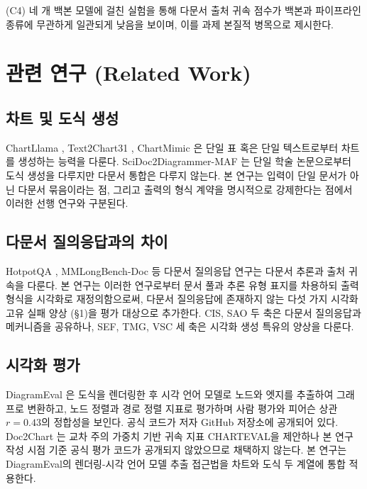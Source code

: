 \documentclass[11pt]{article}
\begin{document}
(C4) 네 개 백본 모델에 걸친 실험을 통해 다문서 출처 귀속 점수가 백본과 파이프라인 종류에 무관하게 일관되게 낮음을 보이며, 이를 과제 본질적 병목으로 제시한다.

\section{관련 연구 (Related Work)}

\subsection{차트 및 도식 생성}

ChartLlama \cite{han2023chartllama}, Text2Chart31 \cite{zadeh2024text2chart31}, ChartMimic \cite{yang2024chartmimic}은 단일 표 혹은 단일 텍스트로부터 차트를 생성하는 능력을 다룬다. SciDoc2Diagrammer-MAF \cite{mondal2024scidoc2diagrammer}는 단일 학술 논문으로부터 도식 생성을 다루지만 다문서 통합은 다루지 않는다. 본 연구는 입력이 단일 문서가 아닌 다문서 묶음이라는 점, 그리고 출력의 형식 계약을 명시적으로 강제한다는 점에서 이러한 선행 연구와 구분된다.

\subsection{다문서 질의응답과의 차이}

HotpotQA \cite{yang2018hotpotqa}, MMLongBench-Doc \cite{ma2024mmlongbench} 등 다문서 질의응답 연구는 다문서 추론과 출처 귀속을 다룬다. 본 연구는 이러한 연구로부터 문서 풀과 추론 유형 표지를 차용하되 출력 형식을 시각화로 재정의함으로써, 다문서 질의응답에 존재하지 않는 다섯 가지 시각화 고유 실패 양상 (\S 1)을 평가 대상으로 추가한다. CIS, SAO 두 축은 다문서 질의응답과 메커니즘을 공유하나, SEF, TMG, VSC 세 축은 시각화 생성 특유의 양상을 다룬다.

\subsection{시각화 평가}

DiagramEval \cite{liang2025diagrameval}은 도식을 렌더링한 후 시각 언어 모델로 노드와 엣지를 추출하여 그래프로 변환하고, 노드 정렬과 경로 정렬 지표로 평가하며 사람 평가와 피어슨 상관 $r=0.43$의 정합성을 보인다. 공식 코드가 저자 GitHub 저장소에 공개되어 있다. Doc2Chart \cite{jain2025doc2chart}는 교차 주의 가중치 기반 귀속 지표 CHARTEVAL을 제안하나 본 연구 작성 시점 기준 공식 평가 코드가 공개되지 않았으므로 채택하지 않는다. 본 연구는 DiagramEval의 렌더링-시각 언어 모델 추출 접근법을 차트와 도식 두 계열에 통합 적용한다.
\end{document}
